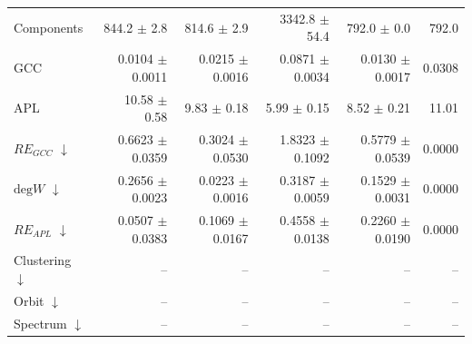 \begin{table}[H]
\begin{tabular}{lrrrrr}
Components                    & 844.2 $\pm$ 2.8 & 814.6 $\pm$ 2.9 & 3342.8 $\pm$ 54.4 & 792.0 $\pm$ 0.0 & 792.0 \\
GCC                           & 0.0104 $\pm$ 0.0011 & 0.0215 $\pm$ 0.0016 & 0.0871 $\pm$ 0.0034 & 0.0130 $\pm$ 0.0017 & 0.0308 \\
APL                           & 10.58 $\pm$ 0.58 & 9.83 $\pm$ 0.18 & 5.99 $\pm$ 0.15 & 8.52 $\pm$ 0.21 & 11.01 \\
\midrule
$RE_{GCC}$ $\downarrow$       & 0.6623 $\pm$ 0.0359 & 0.3024 $\pm$ 0.0530 & 1.8323 $\pm$ 0.1092 & 0.5779 $\pm$ 0.0539 & 0.0000 \\
$\mathrm{deg}W$ $\downarrow$  & 0.2656 $\pm$ 0.0023 & 0.0223 $\pm$ 0.0016 & 0.3187 $\pm$ 0.0059 & 0.1529 $\pm$ 0.0031 & 0.0000 \\
$RE_{APL}$ $\downarrow$       & 0.0507 $\pm$ 0.0383 & 0.1069 $\pm$ 0.0167 & 0.4558 $\pm$ 0.0138 & 0.2260 $\pm$ 0.0190 & 0.0000 \\
Clustering $\downarrow$       & -- & -- & -- & -- & -- \\
Orbit $\downarrow$            & -- & -- & -- & -- & -- \\
Spectrum $\downarrow$         & -- & -- & -- & -- & -- \\
\bottomrule
\end{tabular}
\end{table}
